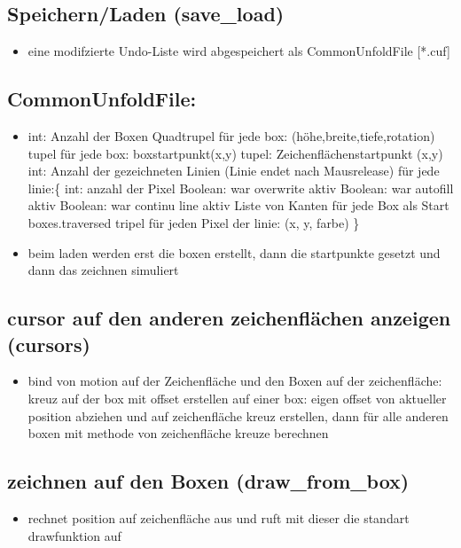\subsection{Speichern/Laden (save\_load)}
\begin{itemize}
\item eine modifzierte Undo-Liste wird abgespeichert als CommonUnfoldFile
{[}{*}.cuf{]}
\end{itemize}

\subsection{CommonUnfoldFile:}
\begin{itemize}
\item int: Anzahl der Boxen Quadtrupel für jede box: (höhe,breite,tiefe,rotation)
tupel für jede box: boxstartpunkt(x,y) tupel: Zeichenflächenstartpunkt
(x,y) int: Anzahl der gezeichneten Linien (Linie endet nach Mausrelease)
für jede linie:\{ int: anzahl der Pixel Boolean: war overwrite aktiv
Boolean: war autofill aktiv Boolean: war continu line aktiv Liste
von Kanten für jede Box als Start boxes.traversed tripel für jeden
Pixel der linie: (x, y, farbe) \}
\item beim laden werden erst die boxen erstellt, dann die startpunkte gesetzt
und dann das zeichnen simuliert
\end{itemize}

\subsection{cursor auf den anderen zeichenflächen anzeigen (cursors)}
\begin{itemize}
\item bind von motion auf der Zeichenfläche und den Boxen auf der zeichenfläche:
kreuz auf der box mit offset erstellen auf einer box: eigen offset
von aktueller position abziehen und auf zeichenfläche kreuz erstellen,
dann für alle anderen boxen mit methode von zeichenfläche kreuze berechnen
\end{itemize}

\subsection{zeichnen auf den Boxen (draw\_from\_box)}
\begin{itemize}
\item rechnet position auf zeichenfläche aus und ruft mit dieser die standart
drawfunktion auf
\end{itemize}

